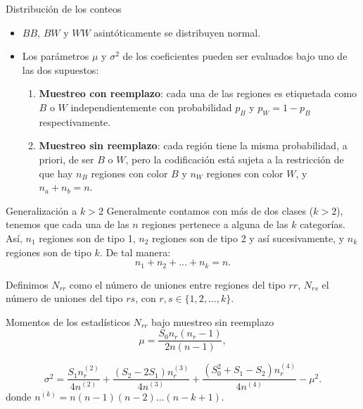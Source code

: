 \documentclass{beamer}
\begin{document}
\begin{frame}{Distribución de los conteos}
  \begin{itemize}
    \item $BB$, $BW$ y $WW$ asintóticamente se distribuyen normal.
    \item Los parámetros $\mu$ y $\sigma^2$ de los coeficientes pueden ser evaluados bajo uno de las dos supuestos:
    \begin{enumerate}
      \item \textbf{Muestreo con reemplazo}: cada una de las regiones es etiquetada como $B$ o $W$ independientemente con probabilidad $p_B$ y $p_W=1-p_B$ respectivamente. 

      \item \textbf{Muestreo sin reemplazo}: cada región tiene la misma probabilidad, a priori, de ser $B$ o $W$, pero la codificación está sujeta a la restricción de que hay $n_B$ regiones con color $B$ y $n_W$ regiones con color $W$, y $n_a+n_b=n$.
    \end{enumerate}
  \end{itemize}
\end{frame}

\begin{frame}{Generalización a $k > 2$}
Generalmente contamos con más de dos clases ($k > 2$), tenemos que cada una de las $n$ regiones pertenece a alguna de las $k$ categorías. Así, $n_{1}$ regiones son de tipo 1, $n_{2}$ regiones son de tipo 2 y así sucesivamente, y $n_{k}$ regiones son de tipo $k$. De tal manera:
\begin{equation}
n_{1}+n_{2}+...+n_{k}=n. \nonumber
\end{equation}

Definimos $N_{rr}$ como el número de uniones entre regiones del tipo $rr$,  $N_{rs}$ el número de uniones del tipo $rs$, con  $r,s \in \{1,2, \dots, k\}$.
\end{frame}

\begin{frame}{Momentos de los estadísticos $N_{rr}$ bajo muestreo sin reemplazo}
  \begin{equation}
  \mu = \dfrac{S_0n_r(n_r-1)}{2n(n-1)} ,
  \end{equation}

  \begin{equation}
  \sigma^2 = \dfrac{S_1n_r^{(2)}}{4n^{(2)}} + \dfrac{(S_2-2S_1)n_r^{(3)}}{4n^{(3)}} + \dfrac{(S_0^2+S_1-S_2)n_r^{(4)}}{4n^{(4)}}-\mu^2 .
  \end{equation}
  donde 
    $n^{(k)}=n(n-1)(n-2)\dots(n-k+1)$.


\end{frame}
\end{document}
